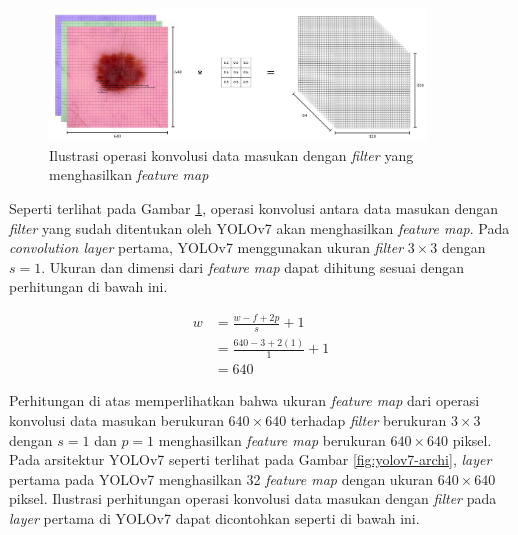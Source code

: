     \begin{figure}[H]
        \centering
            \includegraphics[width=10cm]{img/bab4/convolution.png}
        \caption{Ilustrasi operasi konvolusi data masukan dengan \textit{filter} yang menghasilkan \textit{feature map}}
        \label{fig:d-convol}
    \end{figure}

    Seperti terlihat pada Gambar \ref{fig:d-convol}, operasi konvolusi antara data masukan dengan \textit{filter} yang sudah ditentukan oleh YOLOv7 akan menghasilkan \textit{feature map}. Pada \textit{convolution layer} pertama, YOLOv7 menggunakan ukuran \textit{filter} $3\times 3$ dengan $s=1$. Ukuran dan dimensi dari \textit{feature map} dapat dihitung sesuai dengan perhitungan di bawah ini.

    \begin{align*}
        w &= \frac{w - f + 2p}{s} + 1\\
        &= \frac{640 - 3 + 2(1)}{1} + 1\\
        &= 640
    \end{align*}

    Perhitungan di atas memperlihatkan bahwa ukuran \textit{feature map} dari operasi konvolusi data masukan berukuran $640\times 640$ terhadap \textit{filter} berukuran $3\times 3$ dengan $s=1$ dan $p=1$ menghasilkan \textit{feature map} berukuran $640\times 640$ piksel. Pada arsitektur YOLOv7 seperti terlihat pada Gambar \ref{fig:yolov7-archi}, \textit{layer} pertama pada YOLOv7 menghasilkan 32 \textit{feature map} dengan ukuran $640\times 640$ piksel. Ilustrasi perhitungan operasi konvolusi data masukan dengan \textit{filter} pada \textit{layer} pertama di YOLOv7 dapat dicontohkan seperti di bawah ini.


